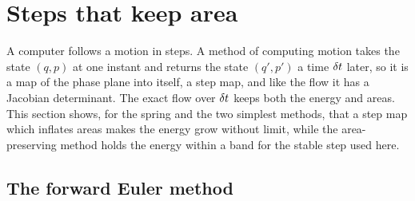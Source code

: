 \section{Steps that keep area}
\label{sec:ha-symplectic}

A computer follows a motion in steps. A method of computing motion takes
the state $(q, p)$ at one instant and returns the state $(q', p')$ a time
$\delta t$ later, so it is a map of the phase plane into itself, a step map,
and like the flow it has a Jacobian determinant. The exact flow over $\delta t$
keeps both the energy and areas. This section shows, for the spring and
the two simplest methods, that a step map which inflates areas makes the
energy grow without limit, while the area-preserving method holds the energy within a band for
the stable step used here.

\subsection*{The forward Euler method}

